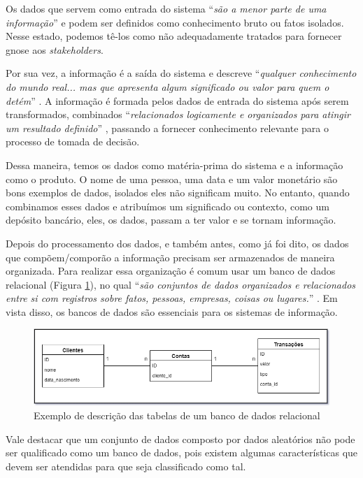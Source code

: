 Os dados que servem como entrada do sistema \enquote{\textit{são a menor parte de uma informação}} \cite{boscarioli2016mineracao} e podem ser definidos como conhecimento bruto ou fatos isolados. Nesse estado, podemos tê-los como não adequadamente tratados para fornecer gnose aos \textit{stakeholders}.

Por sua vez, a informação é a saída do sistema e descreve \enquote{\textit{qualquer conhecimento do mundo real... mas que apresenta algum significado ou valor para quem o detém}} \cite{boscarioli2016mineracao}. A informação é formada pelos dados de entrada do sistema após serem transformados, combinados \enquote{\textit{relacionados logicamente e organizados para atingir um resultado definido}} \cite{vida2021datawarehouse}, passando a fornecer conhecimento relevante para o processo de tomada de decisão.

Dessa maneira, temos os dados como matéria-prima do sistema e a informação como o produto. O nome de uma pessoa, uma data e um valor monetário são bons exemplos de dados, isolados eles não significam muito. No entanto, quando combinamos esses dados e atribuímos um significado ou contexto, como um depósito bancário, eles, os dados, passam a ter valor e se tornam informação.


Depois do processamento dos dados, e também antes, como já foi dito, os dados que compõem/comporão a informação precisam ser armazenados de maneira organizada. Para realizar essa organização é comum usar um banco de dados relacional (Figura \ref{fig:bancoDadosRelacional}), no qual \enquote{\textit{são conjuntos de dados organizados e relacionados entre si com registros sobre fatos, pessoas, empresas, coisas ou lugares.}} \cite{rezende2015obi}. Em vista disso, os bancos de dados são essenciais para os sistemas de informação.

\begin{figure}[ht]
\centering
\includegraphics[width=1\textwidth]{imagens/banco-relacional.png}
\caption{Exemplo de descrição das tabelas de um banco de dados relacional}
\label{fig:bancoDadosRelacional}
\end{figure}

Vale destacar que um conjunto de dados composto por dados aleatórios não pode ser qualificado como um banco de dados, pois existem algumas características que devem ser atendidas para que seja classificado como tal.

